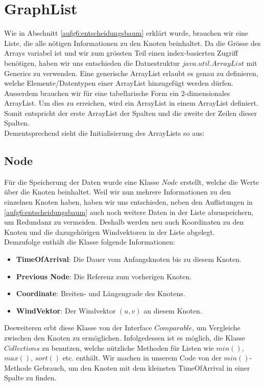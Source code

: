\section{GraphList}
Wie in Abschnitt \ref{aufg6:entscheidungsbaum} erklärt wurde, brauchen wir eine Liste, die alle nötigen Informationen zu den Knoten beinhaltet. Da die Grösse des Arrays variabel ist und wir zum grössten Teil einen index-basierten Zugriff benötigen, haben wir uns entschieden die Datnestruktur $java.util.ArrayList$ mit Generics zu verwenden. Eine generische ArrayList erlaubt es genau zu definieren, welche Elemente/Datentypen einer ArrayList hinzugefügt werden dürfen. Ausserdem brauchen wir für eine tabellarische Form ein 2-dimensionales ArrayList. Um dies zu erreichen, wird ein ArrayList in einem ArrayList definiert. Somit entspricht der erste ArrayList der Spalten und die zweite der Zeilen dieser Spalten. \\
Dementsprechend sieht die Initialisierung des ArrayLists so aus:



\subsection{Node}
Für die Speicherung der Daten wurde eine Klasse $Node$ erstellt, welche die Werte über die Knoten beinhaltet. Weil wir nun mehrere Informationen zu den einzelnen Knoten haben, haben wir uns entschieden, neben den Auflistungen in \ref{aufg6:entscheidungsbaum} auch noch weitere Daten in der Liste abzuspeichern, um Redundanz zu vermeiden. Deshalb werden neu auch Koordinaten zu den Knoten und die dazugehörigen Windvektoren in der Liste abgelegt. \\
Demzufolge enthält die Klasse folgende Informationen:
\begin{itemize}
\item \textbf{TimeOfArrival}: Die Dauer vom Anfangsknoten bis zu diesem Knoten.
\item \textbf{Previous Node}: Die Referenz zum vorherigen Knoten.
\item \textbf{Coordinate}: Breiten- und Längengrade des Knotens.
\item \textbf{WindVektor}: Der Windvektor $(u, v)$ an diesem Knoten.
\end{itemize}

Desweiteren erbt diese Klasse von der Interface $Comparable$, um Vergleiche zwischen den Knoten zu ermöglichen. Infolgedessen ist es möglich, die Klasse $Collections$ zu benutzen, welche nützliche Methoden für Listen wie $min()$, $max()$, $sort()$ etc. enthält. Wir machen in unserem Code von der $min()$-Methode Gebrauch, um den Knoten mit dem kleinsten TimeOfArrival in einer Spalte zu finden. \\

